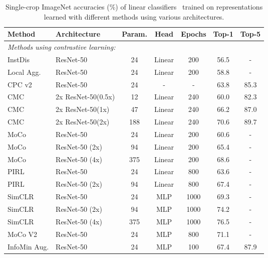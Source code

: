 \documentclass{article}
\begin{document}
\begin{table}[ht]
\vspace{-5pt}
\centering
\setlength{\tabcolsep}{7pt}
\caption{\label{tab:imagenet_archs} \small Single-crop ImageNet accuracies (\%) of linear classifiers~\protect\cite{zhang2016colorful} trained on representations learned with different methods using various architectures. }
\begin{tabular}{llccccc}
\toprule
Method & Architecture        & Param. & Head & Epochs & Top-1 & Top-5 \\ 
\midrule
\multicolumn{7}{l}{\textit{Methods using contrastive learning:}}\\
InstDis~\cite{wu2018unsupervised}   & ResNet-50    & 24  & Linear & 200  & 56.5  & -    \\
Local Agg.~\cite{zhuang2019local}   & ResNet-50    & 24  & Linear & 200  & 58.8  & -     \\
CPC v2~\cite{henaff2019data}        & ResNet-50    & 24  & - &  -   & 63.8  & 85.3  \\
CMC~\cite{tian2019contrastive} & 2x ResNet-50(0.5x)& 12  & Linear  & 240 & 60.0 & 82.3 \\
CMC~\cite{tian2019contrastive} & 2x ResNet-50(1x) & 47  & Linear   & 240 & 66.2 & 87.0 \\
CMC~\cite{tian2019contrastive} & 2x ResNet-50(2x)& 188 & Linear    & 240 & 70.6 & 89.7 \\
MoCo~\cite{he2019momentum} & ResNet-50      & 24  & Linear    & 200 & 60.6 & - \\
MoCo~\cite{he2019momentum} & ResNet-50 (2x) & 94  & Linear    & 200 & 65.4 & - \\
MoCo~\cite{he2019momentum} & ResNet-50 (4x) & 375 & Linear    & 200 & 68.6 & - \\
PIRL~\cite{misra2019self} & ResNet-50      & 24  & Linear    & 800 & 63.6 & - \\
PIRL~\cite{misra2019self} & ResNet-50 (2x) & 94  & Linear    & 800 & 67.4 & - \\
SimCLR~\cite{chen2020simple} & ResNet-50      & 24  & MLP    & 1000 & 69.3 & - \\
SimCLR~\cite{chen2020simple} & ResNet-50 (2x) & 94  & MLP    & 1000 & 74.2 & - \\
SimCLR~\cite{chen2020simple} & ResNet-50 (4x) & 375 & MLP    & 1000 & 76.5 & - \\
MoCo V2~\cite{chen2020improved} & ResNet-50   & 24  & MLP    & 800 & 71.1 & - \\
InfoMin Aug. & ResNet-50   & 24  & MLP    & 100 & 67.4 & 87.9 \\

\end{tabular}
\end{table}
\end{document}
